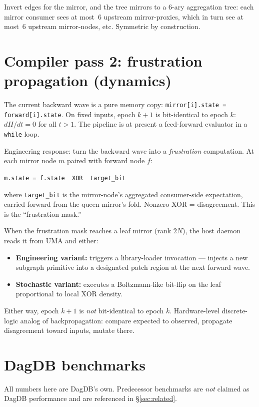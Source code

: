 \documentclass[11pt]{article}
\begin{document}
Invert edges for the mirror, and the tree mirrors to a 6-ary
aggregation tree: each mirror consumer sees at most~$6$ upstream
mirror-proxies, which in turn see at most~$6$ upstream mirror-nodes,
etc. Symmetric by construction.

\section{Compiler pass 2: frustration propagation (dynamics)}
\label{sec:frustration}

The current backward wave is a pure memory copy:
\texttt{mirror[i].state = forward[i].state}. On fixed inputs, epoch
$k+1$ is bit-identical to epoch $k$: $dH/dt = 0$ for all $t > 1$.
The pipeline is at present a feed-forward evaluator in a
\texttt{while} loop.

Engineering response: turn the backward wave into a
\emph{frustration} computation. At each mirror node $m$ paired with
forward node $f$:
\begin{center}
\texttt{m.state = f.state\ \ XOR\ \ target\_bit}
\end{center}
where \texttt{target\_bit} is the mirror-node's aggregated
consumer-side expectation, carried forward from the queen mirror's
fold. Nonzero XOR = disagreement. This is the ``frustration mask.''

When the frustration mask reaches a leaf mirror (rank $2N$), the host
daemon reads it from UMA and either:
\begin{itemize}[label={--},leftmargin=1.6em]
  \item \textbf{Engineering variant:} triggers a library-loader
        invocation --- injects a new subgraph primitive into a
        designated patch region at the next forward wave.
  \item \textbf{Stochastic variant:} executes a Boltzmann-like
        bit-flip on the leaf proportional to local XOR density.
\end{itemize}

Either way, epoch $k+1$ is \emph{not} bit-identical to epoch $k$.
Hardware-level discrete-logic analog of backpropagation: compare
expected to observed, propagate disagreement toward inputs, mutate
there.

\section{DagDB benchmarks}
\label{sec:bench}

All numbers here are DagDB's own. Predecessor benchmarks are
\emph{not} claimed as DagDB performance and are referenced in
\S\ref{sec:related}.
\end{document}
